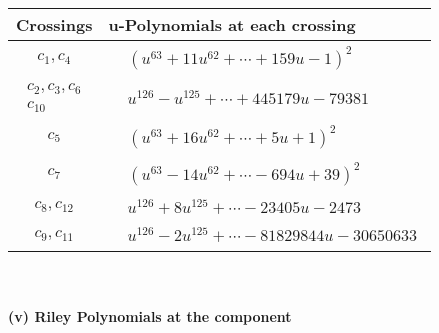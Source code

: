 \documentclass[1p]{elsarticle_modified}
\theoremstyle{definition}
\begin{document}
\begin{tabular}{m{50pt}|m{274pt}}
Crossings & \hspace{64pt}u-Polynomials at each crossing \\
\hline $$\begin{aligned}c_{1},c_{4}\end{aligned}$$&$\begin{aligned}
&(u^{63}+11 u^{62}+\cdots+159 u-1)^{2}
\end{aligned}$\\
\hline $$\begin{aligned}c_{2},c_{3},c_{6}\\c_{10}\end{aligned}$$&$\begin{aligned}
&u^{126}- u^{125}+\cdots+445179 u-79381
\end{aligned}$\\
\hline $$\begin{aligned}c_{5}\end{aligned}$$&$\begin{aligned}
&(u^{63}+16 u^{62}+\cdots+5 u+1)^{2}
\end{aligned}$\\
\hline $$\begin{aligned}c_{7}\end{aligned}$$&$\begin{aligned}
&(u^{63}-14 u^{62}+\cdots-694 u+39)^{2}
\end{aligned}$\\
\hline $$\begin{aligned}c_{8},c_{12}\end{aligned}$$&$\begin{aligned}
&u^{126}+8 u^{125}+\cdots-23405 u-2473
\end{aligned}$\\
\hline $$\begin{aligned}c_{9},c_{11}\end{aligned}$$&$\begin{aligned}
&u^{126}-2 u^{125}+\cdots-81829844 u-30650633
\end{aligned}$\\
\hline
\end{tabular}\\~\\
\newpage\renewcommand{\arraystretch}{1}
\flushleft \textbf{(v) Riley Polynomials at the component}\newline \\
\end{document}
